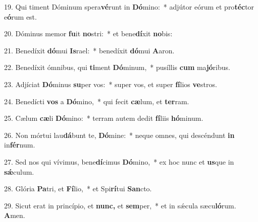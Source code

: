 \item 19. Qui timent Dóminum spera\textbf{vé}runt in \textbf{Dó}mino:~* adjútor eórum et pro\textbf{téc}tor e\textbf{ó}rum est.
\item 20. Dóminus memor \textbf{fu}it \textbf{no}stri:~* et bene\textbf{dí}xit \textbf{no}bis:
\item 21. Benedíxit \textbf{dó}mui \textbf{Is}rael:~* benedíxit \textbf{dó}mui \textbf{A}aron.
\item 22. Benedíxit ómnibus, qui \textbf{ti}ment \textbf{Dó}minum,~* pusíllis \textbf{cum} ma\textbf{jó}ribus.
\item 23. Adjíciat \textbf{Dó}minus \textbf{su}per vos:~* super vos, et super \textbf{fí}lios \textbf{ve}stros.
\item 24. Benedícti \textbf{vos} a \textbf{Dó}mino,~* qui fecit \textbf{cæ}lum, et \textbf{ter}ram.
\item 25. Cælum \textbf{cæ}li \textbf{Dó}mino:~* terram autem dedit \textbf{fí}liis \textbf{hó}minum.
\item 26. Non mórtui lau\textbf{dá}bunt te, \textbf{Dó}mine:~* neque omnes, qui descéndunt \textbf{in} in\textbf{fér}num.
\item 27. Sed nos qui vívimus, bene\textbf{dí}cimus \textbf{Dó}mino,~* ex hoc nunc et \textbf{us}que in \textbf{sǽ}culum.
\item 28. Glória \textbf{Pa}tri, et \textbf{Fí}lio,~* et Spi\textbf{rí}tui \textbf{San}cto.
\item 29. Sicut erat in princípio, et \textbf{nunc,} et \textbf{sem}per,~* et in sǽcula sæcu\textbf{ló}rum. \textbf{A}men.
